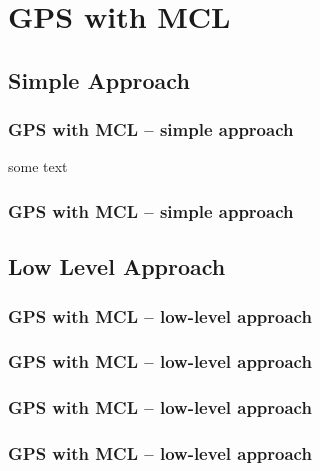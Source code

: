 \documentclass[utf8]{beamer}
\begin{document}
\section{GPS with MCL}
\subsection{Simple Approach}
\begin{frame}
    \frametitle{GPS with MCL -- simple approach}
    some text
\end{frame}

\begin{frame}
    \frametitle{GPS with MCL -- simple approach}
\end{frame}

\subsection{Low Level Approach}
\begin{frame}
    \frametitle{GPS with MCL -- low-level approach}
\end{frame}

\begin{frame}
    \frametitle{GPS with MCL -- low-level approach}
\end{frame}

\begin{frame}
    \frametitle{GPS with MCL -- low-level approach}
\end{frame}

\begin{frame}
    \frametitle{GPS with MCL -- low-level approach}
\end{frame}
\end{document}
